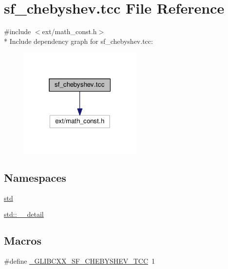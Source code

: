 \hypertarget{sf__chebyshev_8tcc}{}\section{sf\+\_\+chebyshev.\+tcc File Reference}
\label{sf__chebyshev_8tcc}
{\ttfamily \#include $<$ext/math\+\_\+const.\+h$>$}\\*
Include dependency graph for sf\+\_\+chebyshev.\+tcc\+:\nopagebreak
\begin{figure}[H]
\begin{center}
\leavevmode
\includegraphics[width=174pt]{sf__chebyshev_8tcc__incl}
\end{center}
\end{figure}
\subsection*{Namespaces}
\begin{DoxyCompactItemize}
\item 
 \hyperlink{namespacestd}{std}
\item 
 \hyperlink{namespacestd_1_1____detail}{std\+::\+\_\+\+\_\+detail}
\end{DoxyCompactItemize}
\subsection*{Macros}
\begin{DoxyCompactItemize}
\item 
\#define \hyperlink{sf__chebyshev_8tcc_a4a6b0a9b7599b04e1e7316ab679fa7f5}{\+\_\+\+G\+L\+I\+B\+C\+X\+X\+\_\+\+S\+F\+\_\+\+C\+H\+E\+B\+Y\+S\+H\+E\+V\+\_\+\+T\+C\+C}~1
\end{DoxyCompactItemize}
